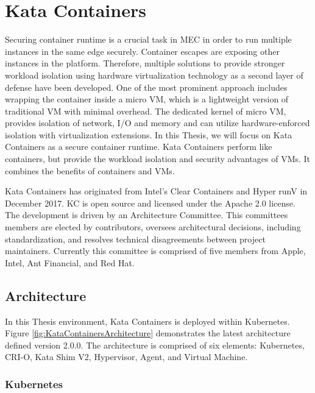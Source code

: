 \chapter{Kata Containers}
\label{chapter:katacontainers}

Securing container runtime is a crucial task in MEC in order to run multiple instances in the same edge securely. Container escapes are exposing other instances in the platform. Therefore, multiple solutions to provide stronger workload isolation using hardware virtualization technology as a second layer of defense have been developed. One of the most prominent approach includes wrapping the container inside a micro VM, which is a lightweight version of traditional VM with minimal overhead. The dedicated kernel of micro VM, provides isolation of network, I/O and memory and can utilize hardware-enforced isolation with virtualization extensions. In this Thesis, we will focus on Kata Containers as a secure container runtime. Kata Containers perform like containers, but provide the workload isolation and security advantages of VMs. It combines the benefits of containers and VMs. \cite{KataContainers}

Kata Containers has originated from Intel's Clear Containers \cite{ClearContainers} and Hyper runV \cite{runV} in December 2017. KC is open source and licensed under the Apache 2.0 license. The development is driven by an Architecture Committee. This committees members are elected by contributors, oversees architectural decisions, including standardization, and resolves technical disagreements between project maintainers. Currently this committee is comprised of five members from Apple, Intel, Ant Financial, and Red Hat. \cite{KataContainersGovernance} \cite{KataContainers}

\section{Architecture}

In this Thesis environment, Kata Containers is deployed within Kubernetes. Figure \ref{fig:KataContainersArchitecture} demonstrates the latest architecture defined version 2.0.0. The architecture is comprised of six elements: Kubernetes, CRI-O, Kata Shim V2, Hypervisor, Agent, and Virtual Machine.

\subsection{Kubernetes}


